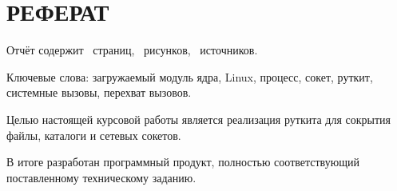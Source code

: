 \chapter*{\hfill{}РЕФЕРАТ\hfill{}}%
\label{cha:referat}

Отчёт содержит
\pageref{LastPage}~страниц,
~рисунков,
~источников.

\sloppy Ключевые слова: загружаемый модуль ядра, Linux, процесс, сокет, руткит, системные вызовы, перехват вызовов.

\sloppy Целью настоящей курсовой работы является реализация руткита для сокрытия файлы, каталоги и сетевых сокетов. 

\sloppy В итоге разработан программный продукт, полностью соответствующий поставленному техническому заданию.
